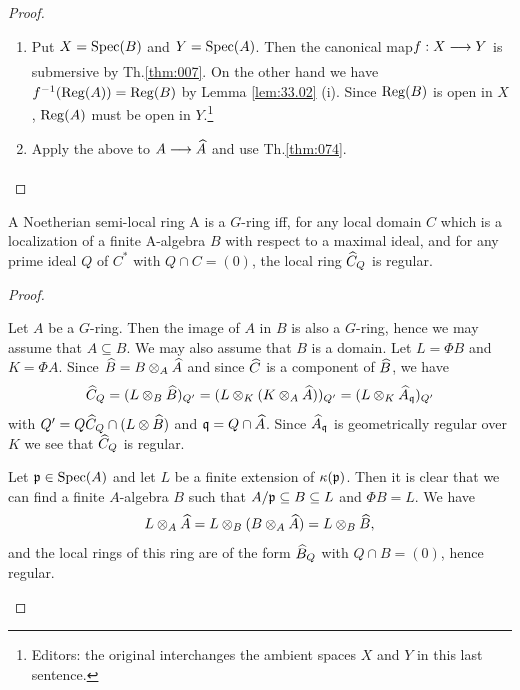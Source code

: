 \documentclass[../main]{subfiles}
\begin{document}
\begin{proof}
\begin{enumerate}
    \item Put $X=\operatorname{Spec}(B)$ and $Y=\operatorname{Spec}(A)$. Then the canonical map\newline $f: X \varrightarrow{} Y$ is submersive by Th.\ref{thm:007}. On the other hand we have \newline $f^{-1}(\operatorname{Reg}(A))=\operatorname{Reg}(B)$ by Lemma \ref{lem:33.02} (i). Since $\operatorname{Reg}(B)$ is open in $X$, $\operatorname{Reg}(A)$ must be open in $Y$.\footnote{Editors: the original interchanges the ambient spaces $X$ and $Y$ in this last sentence.}

    \item Apply the above to $A \varrightarrow{} \completion{A}$ and use Th.\ref{thm:074}.\end{enumerate}
\end{proof}

\begin{parlemma}\label{lem:33.03} A Noetherian semi-local ring A is a $G$-ring iff, for any local domain $C$ which is a localization of a finite A-algebra $B$ with respect to a maximal ideal, and for any prime ideal $Q$ of $C^*$ with $Q \cap C=(0)$, the local ring $\widehat{C}_Q$ is regular.
\end{parlemma}

\begin{proof}\phantom{,}
\begin{implyenumerate}
    \item[``Only if''.] Let $A$ be a $G$-ring. Then the image of $A$ in $B$ is also a $G$-ring, hence we may assume that $A \subseteq B$. We may also assume that $B$ is a domain. Let $L=\Phi B$ and $K=\Phi A$. Since $\widehat{B}=B\otimes_A \widehat{A}$ and since $\widehat{C}$ is a component of $\widehat{B}$, we have
    \[\widehat{C}_Q = (L\otimes_B \widehat{B})_{Q'} = (L\otimes_K (K\otimes_A\widehat{A}))_{Q'}=(L\otimes_K \widehat{A}_{\mathfrak{q}})_{Q'}\]
    with $Q'= Q\widehat{C}_Q \cap (L\otimes \widehat{B}) $ and $\mathfrak{q}=Q\cap \widehat{A}$. Since $\widehat{A}_{\mathfrak{q}}$ is geometrically regular over $K$ we see that $\widehat{C}_Q$ is regular.
    \item[``If''.] Let $\mathfrak{p} \in \operatorname{Spec}(A)$ and let $L$ be a finite extension
    of $\kappa(\mathfrak{p})$. Then it is clear that we can find a finite $A$-algebra $B$ such that $A / \mathfrak{p} \subseteq B \subseteq L$ and $\Phi B=L$. We have \[L \otimes_A \widehat{A}=L \otimes_B(B \otimes_A \widehat{A})=L \otimes_B \widehat{B},\] and the local rings of this ring are of the form $ \widehat{B}_Q$ with $Q \cap B=(0)$, hence regular.
\end{implyenumerate}
\end{proof}
\end{document}
